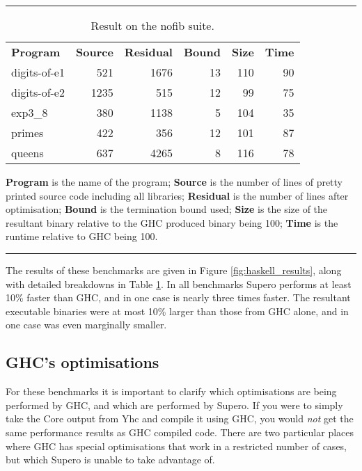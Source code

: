 \documentclass{llncs}
\begin{document}
\begin{table}[tb]
\hrule
\vspace{3mm}

\begin{tabular}{lrrrrr}
\textbf{Program} & \hspace{5mm}\textbf{Source} & \hspace{5mm}\textbf{Residual} & \hspace{5mm}\textbf{Bound} & \hspace{5mm}\textbf{Size} & \hspace{5mm}\textbf{Time} \\
digits-of-e1 &  521 & 1676 & 13 & 110 & 90 \\
digits-of-e2 & 1235 &  515 & 12 &  99 & 75 \\
exp3\_8      &  380 & 1138 &  5 & 104 & 35 \\
primes       &  422 &  356 & 12 & 101 & 87 \\
queens       &  637 & 4265 &  8 & 116 & 78 \\
\end{tabular}
\vspace{2mm}

\textbf{Program} is the name of the program; \textbf{Source} is the number of lines of pretty printed source code including all libraries; \textbf{Residual} is the number of lines after optimisation; \textbf{Bound} is the termination bound used; \textbf{Size} is the size of the resultant binary relative to the GHC produced binary being 100; \textbf{Time} is the runtime relative to GHC being 100.

\vspace{4mm}
\hrule
\vspace{2mm}
\caption{Result on the nofib suite.}
\label{tab:haskell_results}
\end{table}

The results of these benchmarks are given in Figure \ref{fig:haskell_results}, along with detailed breakdowns in Table \ref{tab:haskell_results}. In all benchmarks Supero performs at least 10\% faster than GHC, and in one case is nearly three times faster. The resultant executable binaries were at most 10\% larger than those from GHC alone, and in one case was even marginally smaller.

\subsection{GHC's optimisations}

For these benchmarks it is important to clarify which optimisations are being performed by GHC, and which are performed by Supero. If you were to simply take the Core output from Yhc and compile it using GHC, you would \textit{not} get the same performance results as GHC compiled code. There are two particular places where GHC has special optimisations that work in a restricted number of cases, but which Supero is unable to take advantage of.
\end{document}
